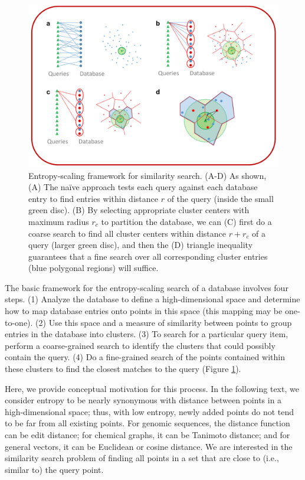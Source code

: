 \documentclass[review,preprint,12pt]{elsarticle}
\theoremstyle{definition}
\theoremstyle{remark}
\numberwithin{equation}{section}
\begin{document}
\begin{figure}[p]
    \centering
    \centerline{\includegraphics[width=8in]{assets/dataStructure.png}}
    \caption{ Entropy-scaling framework for similarity search. %
            (A-D) As shown, %
            (A) The na\"ive approach tests each query against each database entry to find entries within distance $r$ of the query (inside the small green disc). %
            (B) By selecting appropriate cluster centers with maximum radius $r_c$ to partition the database, we can (C) first do a coarse search to find all cluster centers within distance $r+r_c$ of a query (larger green disc), %
 and then the (D) triangle inequality guarantees that a fine search over all corresponding cluster entries (blue polygonal regions) will suffice.}
    \label{fig:dataStructure}
\end{figure}

The basic framework for the entropy-scaling search of a database involves four steps.
(1) Analyze the database to define a high-dimensional space and determine how to map database entries onto points in this space (this mapping may be one-to-one).
(2) Use this space and a measure of similarity between points to group entries in the database into clusters.
(3) To search for a particular query item, perform a coarse-grained search to identify the clusters that could possibly contain the query.
(4) Do a fine-grained search of the points contained within these clusters to find the closest matches to the query (Figure \ref{fig:dataStructure}).

Here, we provide conceptual motivation for this process.
In the following text, we consider entropy to be nearly synonymous with distance between points in a high-dimensional space; thus, with low entropy, newly added points do not tend to be far from all existing points. 
For genomic sequences, the distance function can be edit distance; for chemical graphs, it can be Tanimoto distance; and for general vectors, it can be Euclidean or cosine distance.
We are interested in the similarity search problem of finding all points in a set that are close to (i.e., similar to) the query point.
\end{document}
